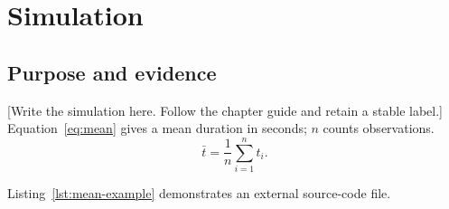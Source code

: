 \chapter{Simulation}
\label{chap:simulation}
\section{Purpose and evidence}
[Write the simulation here. Follow the chapter guide and retain a stable label.]
Equation~\ref{eq:mean} gives a mean duration in seconds; $n$ counts observations.
\begin{equation}
\bar{t}=\frac{1}{n}\sum_{i=1}^{n}t_i .
\label{eq:mean}
\end{equation}

Listing~\ref{lst:mean-example} demonstrates an external source-code file.

